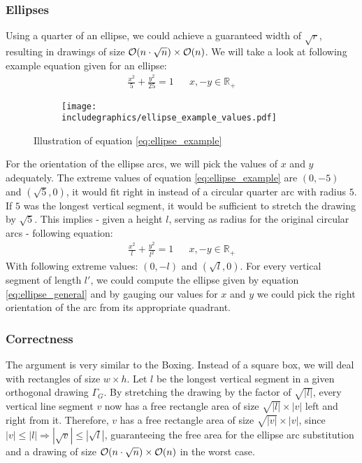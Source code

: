\subsubsection*{Ellipses}
Using a quarter of an ellipse, we could achieve a guaranteed width of $\sqrt{r}$, resulting in drawings of size $\mathcal{O}(n\cdot\sqrt{n})\times\mathcal{O}(n)$. We will take a look at following example equation given for an ellipse:
\begin{align}
\frac{x^2}{5} + \frac{y^2}{25} = 1&&x,-y \in \mathbb{R}_+\label{eq:ellipse_example}
\end{align}
\begin{figure}[H]
	\centering
	\begin{subfigure}{0.4\textwidth}
		\centering
		\texttt{[image: includegraphics/ellipse\_example\_values.pdf]}
	\end{subfigure}
	\caption{Illustration of equation \ref{eq:ellipse_example}}\label{im:ellipse5}
\end{figure}
For the orientation of the ellipse arcs, we will pick the values of $x$ and $y$ adequately. The extreme values of equation \ref{eq:ellipse_example} are $(0,-5)$ and $(\sqrt{5},0)$, it would fit right in instead of a circular quarter arc with radius $5$. If $5$ was the longest vertical segment, it would be sufficient to stretch the drawing by $\sqrt{5}$.
This implies - given a height $l$, serving as radius for the original circular arcs - following equation:
\begin{align}
\frac{x^2}{l}+\frac{y^2}{l^2} = 1&&x,-y \in \mathbb{R}_+\label{eq:ellipse_general}
\end{align}
With following extreme values: $(0,-l)$ and $(\sqrt{l},0)$. For every vertical segment of length $l'$, we could compute the ellipse given by equation \ref{eq:ellipse_general} and by gauging our values for $x$ and $y$ we could pick the right orientation of the arc from its appropriate quadrant. 
\subsubsection*{Correctness}
The argument is very similar to the \grqq Boxing\grqq. Instead of a square box, we will deal with rectangles of size $w\times h$. Let $l$ be the longest vertical segment in a given orthogonal drawing $\Gamma_G$. By stretching the drawing by the factor of $\sqrt{|l|}$, every vertical line segment $v$ now has a free rectangle area of size $\sqrt{|l|} \times |v|$ left and right from it. Therefore, $v$ has a free rectangle area of size $\sqrt{|v|} \times |v|$, since $|v| \leq |l| \Rightarrow |\sqrt{v}| \leq |\sqrt{l}|$, guaranteeing the free area for the ellipse arc substitution and a drawing of size $\mathcal{O}(n\cdot\sqrt{n})\times\mathcal{O}(n)$ in the worst case.
